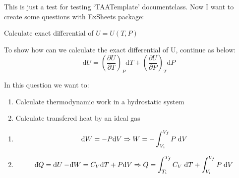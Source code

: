 \documentclass[LTR]{TAATemplate}
\def\dbar{{\mathchar'26\mkern-12mu \mathrm{d}}}
\begin{document}
This is just a test for testing `TAATemplate' documentclass.
Now I want to create some questions with ExSheets package:

\begin{question}{2}
    Calculate exact differential of $U = U(T, P)$ 
\end{question}
\begin{solution}
    To show how can we calculate the exact differential of U, continue as below:
    $$\mathrm{d}U = \left(\frac{\partial U}{\partial T}\right)_{P} \mathrm{d}T + \left(\frac{\partial U}{\partial P}\right)_{T} \mathrm{d}P$$
\end{solution}

\begin{question}{1}
    In this question we want to:
    \begin{enumerate}[label={\alph*)}]
        \item Calculate thermodynamic work in a hydrostatic system 
        \item Calculate transfered heat by an ideal gas
    \end{enumerate}
\end{question}
\begin{solution}
    \begin{enumerate}[label={\alph*)}]
        \item $$\dbar W = -P\mathrm{d}V \Rightarrow W  = -\int_{V_i}^{V_f} P\; \mathrm{d}V$$
        \item $$\dbar Q = \mathrm{d}U - \dbar W = C_{V}\mathrm{d}T + P\mathrm{d}V \Rightarrow Q = \int_{T_i}^{T_f} C_{V}\; \mathrm{d}T + \int_{V_i}^{V_f} P\; \mathrm{d}V$$
    \end{enumerate}
\end{solution}
\end{document}

